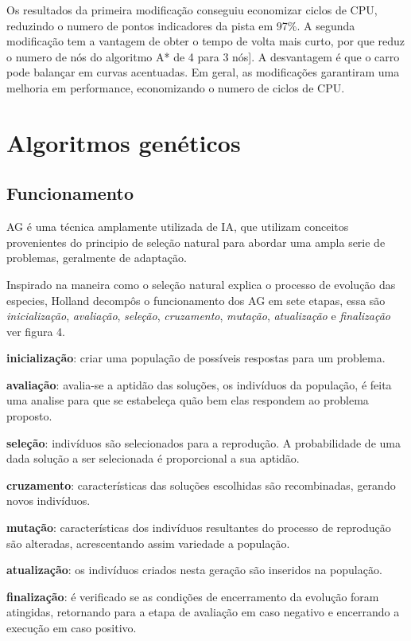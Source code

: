 Os resultados da primeira modificação conseguiu economizar ciclos de CPU, reduzindo o numero de pontos indicadores da pista em 97\%. A segunda modificação tem a vantagem de obter o tempo de volta mais curto, por que reduz o numero de nós do algoritmo A* de 4 para 3 nós]. A desvantagem é que o carro pode balançar em curvas acentuadas. Em geral, as modificações garantiram uma melhoria em performance, economizando o numero de ciclos de CPU.

\section{Algoritmos genéticos}

\subsection{Funcionamento}

AG é uma técnica amplamente utilizada de IA, que utilizam conceitos provenientes do principio de seleção natural para abordar uma  ampla serie de problemas, geralmente de adaptação. 

Inspirado na maneira como o seleção natural explica o processo de evolução das especies, Holland \cite{Holland1975} decompôs o funcionamento dos AG em sete etapas, essa são \textit{inicialização}, \textit{avaliação}, \textit{seleção}, \textit{cruzamento}, \textit{mutação}, \textit{atualização} e  \textit{finalização} ver figura 4.


\textbf{inicialização}: criar uma população de possíveis respostas para um problema. 

\textbf{avaliação}: avalia-se a aptidão das soluções, os indivíduos da população, é feita uma analise para que se estabeleça quão bem elas respondem ao problema proposto.

\textbf{seleção}: indivíduos são selecionados para a reprodução. A probabilidade de uma dada solução a ser selecionada é proporcional a sua aptidão.

\textbf{cruzamento}: características das soluções escolhidas são recombinadas, gerando novos indivíduos.

\textbf{mutação}: características dos indivíduos resultantes do processo de reprodução são alteradas, acrescentando assim variedade a população.

\textbf{atualização}: os indivíduos criados nesta geração são inseridos na população.

\textbf{finalização}: é verificado se as condições de encerramento da evolução foram atingidas, retornando para a etapa de avaliação em caso negativo e encerrando a execução em caso positivo.

